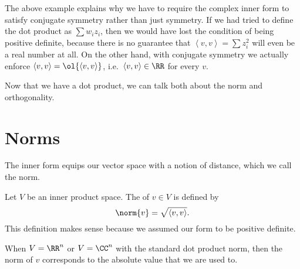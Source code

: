 The above example explains why we have to require the complex inner form
to satisfy conjugate symmetry rather than just symmetry.
If we had tried to define the dot product as $\sum w_i z_i$,
then we would have lost the condition of being positive definite,
because there is no guarantee that $\left< v,v \right> = \sum z_i^2$ will even be a real number at all.
On the other hand, with conjugate symmetry we actually enforce $\left< v,v \right> = \ol{\left< v,v \right>}$,
i.e.\ $\left< v,v \right> \in \RR$ for every $v$.

Now that we have a dot product, we can talk both about the norm and orthogonality.

\section{Norms}

The inner form equips our vector space with a notion of distance, which we call the norm.
\begin{definition}
	Let $V$ be an inner product space.
	The  of $v \in V$ is defined by 
	\[ \norm{v} = \sqrt{\left<v,v\right>}. \]
	This definition makes sense because we assumed our form to be positive definite.
\end{definition}

\begin{example}
	When $V = \RR^n$ or $V = \CC^n$ with the standard dot product norm,
	then the norm of $v$ corresponds to the absolute value that we are used to.
\end{example}

